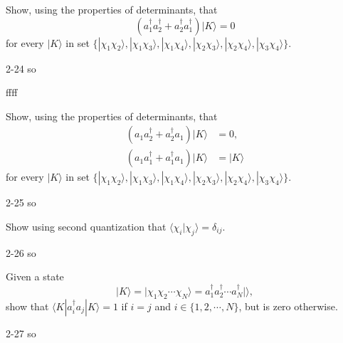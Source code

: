 \documentclass[a4paper]{book}
\begin{document}
	\begin{exercise}
	Show, using the properties of determinants, that
	\[
		( a^\dagger_1 a^\dagger_2 + a^\dagger_2 a^\dagger_1 ) | K \rangle = 0 
	\]
	for every $| K \rangle$ in set $\{ |\chi_1\chi_2\rangle , |\chi_1\chi_3\rangle , |\chi_1\chi_4\rangle , |\chi_2\chi_3\rangle , |\chi_2\chi_4\rangle , |\chi_3\chi_4\rangle \}$.
	\end{exercise}
	
	\begin{solution}
		2-24 so
		
		ffff
	\end{solution}
	
	\begin{exercise}
	Show, using the properties of determinants, that
	\begin{align*}
		( a_1 a^\dagger_2 + a^\dagger_2 a_1 ) | K \rangle &= 0 , \\
		( a_1 a^\dagger_1 + a^\dagger_1 a_1 ) | K \rangle &= | K \rangle
	\end{align*}
	for every $| K \rangle$ in set $\{ |\chi_1\chi_2\rangle , |\chi_1\chi_3\rangle , |\chi_1\chi_4\rangle , |\chi_2\chi_3\rangle , |\chi_2\chi_4\rangle , |\chi_3\chi_4\rangle \}$.
	\end{exercise}
	
	\begin{solution}
		2-25 so
	\end{solution}
	
	\begin{exercise}
	Show using second quantization that $\langle \chi_i | \chi_j \rangle = \delta_{ij}$.
	\end{exercise}
	
	\begin{solution}
		2-26 so
	\end{solution}

	\begin{exercise}
	Given a state 
	\[
		| K \rangle = | \chi_1 \chi_2 \cdots \chi_N \rangle = a^\dagger_1 a^\dagger_2 \cdots a^\dagger_N | \rangle,
	\]
	show that $\langle K | a^\dagger_i a_j | K \rangle = 1$ if $i=j$ and $i \in \{ 1 , 2 , \cdots, N \}$, but is zero otherwise.
	\end{exercise}
	
	\begin{solution}
		2-27 so
	\end{solution}
	
\end{document}
